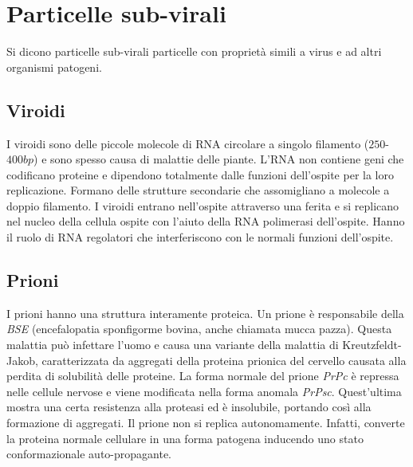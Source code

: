 \section{Particelle sub-virali}
Si dicono particelle sub-virali particelle con propriet\`a simili a virus e ad altri organismi patogeni.

	\subsection{Viroidi}
	I viroidi sono delle piccole molecole di RNA circolare a singolo filamento ($250$-$400 bp$) e sono spesso causa di malattie delle piante. 
	L'RNA non contiene geni che codificano proteine e dipendono totalmente dalle funzioni dell'ospite per la loro replicazione. 
	Formano delle strutture secondarie che assomigliano a molecole a doppio filamento. 
	I viroidi entrano nell'ospite attraverso una ferita e si replicano nel nucleo della cellula ospite con l'aiuto della RNA polimerasi dell'ospite. 
	Hanno il ruolo di RNA regolatori che interferiscono con le normali funzioni dell'ospite. 

	\subsection{Prioni}
	I prioni hanno una struttura interamente proteica. 
	Un prione \`e responsabile della \emph{BSE} (encefalopatia sponfigorme bovina, anche chiamata mucca pazza). 
	Questa malattia può infettare l'uomo e causa una variante della malattia di Kreutzfeldt-Jakob, caratterizzata da aggregati della proteina prionica del cervello causata alla perdita di solubilità delle proteine.
	La forma normale del prione \emph{PrPc} è repressa nelle cellule nervose e viene modificata nella forma anomala \emph{PrPsc}. 
	Quest'ultima mostra una certa resistenza alla proteasi ed è insolubile, portando così alla formazione di aggregati. 
	Il prione non si replica autonomamente. 
	Infatti, converte la proteina normale cellulare in una forma patogena inducendo uno stato conformazionale auto-propagante.
